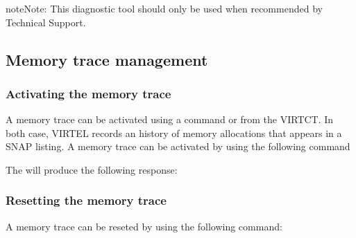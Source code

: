 \documentclass[letterpaper,10pt,english]{sphinxmanual}
\begin{document}
\begin{sphinxadmonition}{note}{Note:}
\sphinxAtStartPar
This diagnostic tool should only be used when recommended by Technical Support.
\end{sphinxadmonition}

\ignorespaces 

\subsection{Memory trace management}
\label{\detokenize{audit_operations_ and_performance:memory-trace-management}}\label{\detokenize{audit_operations_ and_performance:index-42}}

\subsubsection{Activating the memory trace}
\label{\detokenize{audit_operations_ and_performance:activating-the-memory-trace}}
\sphinxAtStartPar
A memory trace can be activated using a command or from the VIRTCT. In both case, VIRTEL records an history of memory allocations that appears in a SNAP listing. A memory trace can be activated by using the following command

\begin{sphinxVerbatim}[commandchars=\\\{\}]
\end{sphinxVerbatim}

\sphinxAtStartPar
The will produce the following response:

\begin{sphinxVerbatim}[commandchars=\\\{\}]
 
   
          
\end{sphinxVerbatim}


\subsubsection{Resetting the memory trace}
\label{\detokenize{audit_operations_ and_performance:resetting-the-memory-trace}}
\sphinxAtStartPar
A memory trace can be reseted by using the following command:\sphinxhyphen{}
\end{document}
